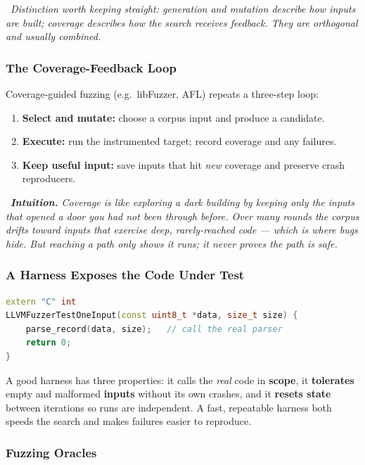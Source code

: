 \documentclass[hidelinks]{article}
\newcommand{\callout}[1]{\par\smallskip\noindent{\color{capri}$\blacktriangleright$}\ \textit{#1}\par\smallskip}
\begin{document}
\callout{Distinction worth keeping straight: generation and mutation describe \emph{how inputs are built}; coverage describes \emph{how the search receives feedback}. They are orthogonal and usually combined.}

\subsubsection{The Coverage-Feedback Loop}

Coverage-guided fuzzing (e.g.\ libFuzzer, AFL) repeats a three-step loop:
\begin{enumerate}
    \item \textbf{Select and mutate:} choose a corpus input and produce a candidate.
    \item \textbf{Execute:} run the instrumented target; record coverage and any failures.
    \item \textbf{Keep useful input:} save inputs that hit \emph{new} coverage and preserve crash reproducers.
\end{enumerate}

\callout{\textbf{Intuition.} Coverage is like exploring a dark building by keeping only the inputs that opened a door you had not been through before. Over many rounds the corpus drifts toward inputs that exercise deep, rarely-reached code --- which is where bugs hide. But reaching a path only shows it \emph{runs}; it never \emph{proves} the path is safe.}

\subsubsection{A Harness Exposes the Code Under Test}

\begin{lstlisting}[language=C++]
extern "C" int
LLVMFuzzerTestOneInput(const uint8_t *data, size_t size) {
    parse_record(data, size);   // call the real parser
    return 0;
}
\end{lstlisting}
A good harness has three properties: it calls the \emph{real} code in \textbf{scope}, it \textbf{tolerates} empty and malformed \textbf{inputs} without its own crashes, and it \textbf{resets state} between iterations so runs are independent. A fast, repeatable harness both speeds the search and makes failures easier to reproduce.

\subsubsection{Fuzzing Oracles}
\end{document}
